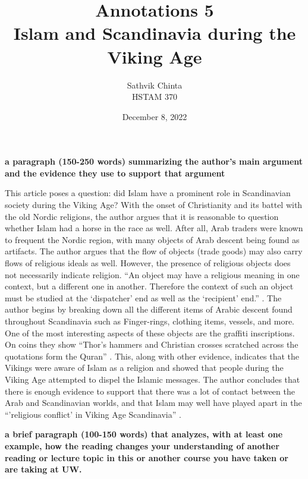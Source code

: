 \documentclass[a4paper]{article}
\title {
	Annotations 5\\ Islam and Scandinavia during the Viking Age
}
\author {
	\normalsize Sathvik Chinta\\\normalsize
    \normalsize HSTAM 370\\\normalsize
}
\date {
	\color{black} December 8, 2022
}
\begin{document}
 \maketitle

        \textbf{a paragraph (150-250 words) summarizing the author's main argument and the evidence they use to support that argument}
        
        This article poses a question: did Islam have a prominent role in Scandinavian society during the Viking Age? With the onset
        of Christianity and its battel with the old Nordic religions, the author argues that it is reasonable to question whether 
        Islam had a horse in the race as well. After all, Arab traders were known to frequent the Nordic region, with many objects 
        of Arab descent being found as artifacts. The author argues that the flow of objects (trade goods) may also carry flows of 
        religious ideals as well. However, the presence of religious objects does not necessarily indicate religion. 
        “An object may have a religious meaning in one context, but a different one in another. Therefore the context of 
        such an object must be studied at the ‘dispatcher’ end as well as the ‘recipient’ end.” \citep[p.39]{EMikk}. The 
        author begins by breaking down all the different items of Arabic descent found throughout Scandinavia such as Finger-rings, 
        clothing items, vessels, and more. One of the most interesting aspects of these objects are the graffiti inscriptions. 
        On coins they show “Thor's hammers and Christian crosses scratched across the quotations form the Quran” \citep[p.49]{EMikk}. 
        This, along with other evidence, indicates that the Vikings were aware of Islam as a religion and showed that people during 
        the Viking Age attempted to dispel the Islamic messages. The author concludes that there is enough evidence to support 
        that there was a lot of contact between the Arab and Scandinavian worlds, and that Islam may well have played apart in the 
        “’religious conflict’ in Viking Age Scandinavia” \citep[p.50]{EMikk}.


        \textbf{a brief paragraph (100-150 words) that analyzes, with at least one example, how the reading changes your understanding of another reading or lecture topic in this or another course you have taken or are taking at UW.}
\end{document}
